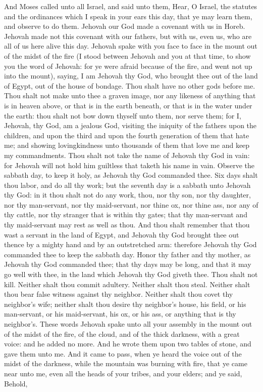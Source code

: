 And Moses called unto all Israel, and said unto them, Hear, O Israel, the statutes and the ordinances which I speak in your ears this day, that ye may learn them, and observe to do them. Jehovah our God made a covenant with us in Horeb. Jehovah made not this covenant with our fathers, but with us, even us, who are all of us here alive this day. Jehovah spake with you face to face in the mount out of the midst of the fire (I stood between Jehovah and you at that time, to show you the word of Jehovah: for ye were afraid because of the fire, and went not up into the mount), saying,  I am Jehovah thy God, who brought thee out of the land of Egypt, out of the house of bondage.  Thou shalt have no other gods before me.  Thou shalt not make unto thee a graven image, nor any likeness of anything that is in heaven above, or that is in the earth beneath, or that is in the water under the earth: thou shalt not bow down thyself unto them, nor serve them; for I, Jehovah, thy God, am a jealous God, visiting the iniquity of the fathers upon the children, and upon the third and upon the fourth generation of them that hate me; and showing lovingkindness unto thousands of them that love me and keep my commandments.  Thou shalt not take the name of Jehovah thy God in vain: for Jehovah will not hold him guiltless that taketh his name in vain.  Observe the sabbath day, to keep it holy, as Jehovah thy God commanded thee. Six days shalt thou labor, and do all thy work; but the seventh day is a sabbath unto Jehovah thy God: in it thou shalt not do any work, thou, nor thy son, nor thy daughter, nor thy man-servant, nor thy maid-servant, nor thine ox, nor thine ass, nor any of thy cattle, nor thy stranger that is within thy gates; that thy man-servant and thy maid-servant may rest as well as thou. And thou shalt remember that thou wast a servant in the land of Egypt, and Jehovah thy God brought thee out thence by a mighty hand and by an outstretched arm: therefore Jehovah thy God commanded thee to keep the sabbath day.  Honor thy father and thy mother, as Jehovah thy God commanded thee; that thy days may be long, and that it may go well with thee, in the land which Jehovah thy God giveth thee.  Thou shalt not kill.  Neither shalt thou commit adultery.  Neither shalt thou steal.  Neither shalt thou bear false witness against thy neighbor.  Neither shalt thou covet thy neighbor’s wife; neither shalt thou desire thy neighbor’s house, his field, or his man-servant, or his maid-servant, his ox, or his ass, or anything that is thy neighbor’s.  These words Jehovah spake unto all your assembly in the mount out of the midst of the fire, of the cloud, and of the thick darkness, with a great voice: and he added no more. And he wrote them upon two tables of stone, and gave them unto me. And it came to pass, when ye heard the voice out of the midst of the darkness, while the mountain was burning with fire, that ye came near unto me, even all the heads of your tribes, and your elders; and ye said, Behold, 